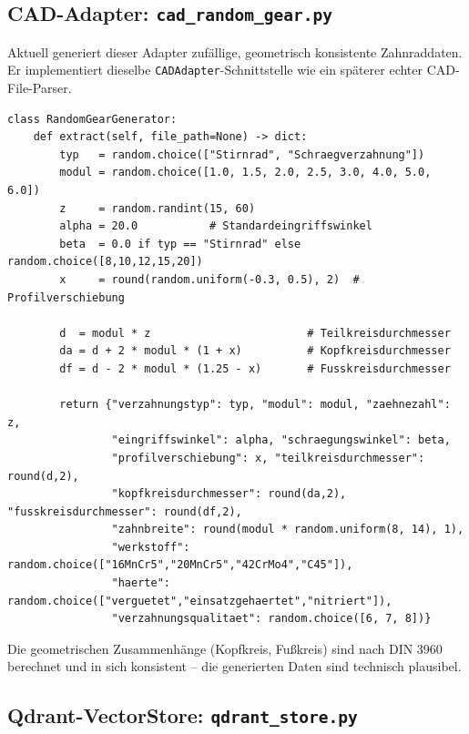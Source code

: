 \documentclass[12pt, a4paper]{article}
\begin{document}
\subsection{CAD-Adapter: \texttt{cad\_random\_gear.py}}

Aktuell generiert dieser Adapter zufällige, geometrisch konsistente Zahnraddaten.
Er implementiert dieselbe \texttt{CADAdapter}-Schnittstelle wie ein späterer echter
CAD-File-Parser.

\begin{lstlisting}[style=pythonstyle, caption={Zufalls-Zahnrad-Generator}]
class RandomGearGenerator:
    def extract(self, file_path=None) -> dict:
        typ   = random.choice(["Stirnrad", "Schraegverzahnung"])
        modul = random.choice([1.0, 1.5, 2.0, 2.5, 3.0, 4.0, 5.0, 6.0])
        z     = random.randint(15, 60)
        alpha = 20.0           # Standardeingriffswinkel
        beta  = 0.0 if typ == "Stirnrad" else random.choice([8,10,12,15,20])
        x     = round(random.uniform(-0.3, 0.5), 2)  # Profilverschiebung

        d  = modul * z                        # Teilkreisdurchmesser
        da = d + 2 * modul * (1 + x)          # Kopfkreisdurchmesser
        df = d - 2 * modul * (1.25 - x)       # Fusskreisdurchmesser

        return {"verzahnungstyp": typ, "modul": modul, "zaehnezahl": z,
                "eingriffswinkel": alpha, "schraegungswinkel": beta,
                "profilverschiebung": x, "teilkreisdurchmesser": round(d,2),
                "kopfkreisdurchmesser": round(da,2), "fusskreisdurchmesser": round(df,2),
                "zahnbreite": round(modul * random.uniform(8, 14), 1),
                "werkstoff": random.choice(["16MnCr5","20MnCr5","42CrMo4","C45"]),
                "haerte": random.choice(["verguetet","einsatzgehaertet","nitriert"]),
                "verzahnungsqualitaet": random.choice([6, 7, 8])}
\end{lstlisting}

Die geometrischen Zusammenhänge (Kopfkreis, Fußkreis) sind nach DIN 3960 berechnet
und in sich konsistent -- die generierten Daten sind technisch plausibel.

\subsection{Qdrant-VectorStore: \texttt{qdrant\_store.py}}
\end{document}
